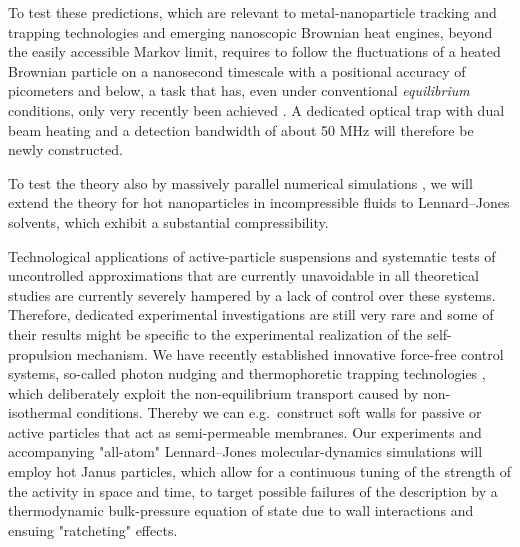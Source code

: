 \begin{workpackage}
\begin{tasklist}
\begin{task}[title=Noise Temperature,id=task3,lead=Leipzig,wphases=0-24!0.5]
To test these predictions, which are relevant to metal-nanoparticle tracking and trapping technologies and emerging
nanoscopic Brownian heat engines, beyond the easily accessible Markov limit, requires to follow the fluctuations of 
a heated Brownian particle on a nanosecond timescale with a positional accuracy of picometers and below, a task 
that has, even under conventional \emph{equilibrium} conditions, only very recently been achieved \cite{kheifets-etal:2014}.
%
A dedicated optical trap with dual beam heating and a detection bandwidth of about 50 MHz
will therefore be newly constructed.

To test the theory also by massively parallel numerical simulations \cite{chakraborty-etal:2011}, 
we will extend the theory for hot nanoparticles in incompressible fluids 
to Lennard--Jones solvents, which exhibit a substantial compressibility.
\end{task}

\begin{task}[title=Active-Particle Suspensions,id=task4,lead=Leipzig,wphases=24-48!0.5]
Technological applications of active-particle suspensions and systematic tests of
uncontrolled approximations that are currently unavoidable in all theoretical studies are
currently severely hampered by a lack of control over these systems.
%
Therefore, dedicated experimental investigations are still very rare and some of their
results might be specific to the experimental realization of the self-propulsion mechanism.
%
We have recently established innovative force-free control systems, so-called photon nudging
and thermophoretic trapping technologies \cite{Qian2013,Braun:NanoLetters:2015}, which deliberately exploit 
the non-equilibrium transport caused by non-isothermal conditions.
%
Thereby we can e.g.\ construct soft walls for passive or active particles that act as
semi-permeable membranes.
%
Our experiments and accompanying "all-atom" Lennard--Jones molecular-dynamics simulations \cite{chakraborty-etal:2011} 
will employ hot Janus particles, which allow for a continuous tuning of the strength of 
the activity in space and time, to target 
possible failures of the description by a thermodynamic bulk-pressure equation of
state \cite{ginot-etal:2015} due to wall interactions and ensuing "ratcheting" effects.
\end{task}


\end{tasklist}

\printbibliography[heading=proposal-bib,env=proposal-env]


\end{workpackage}
